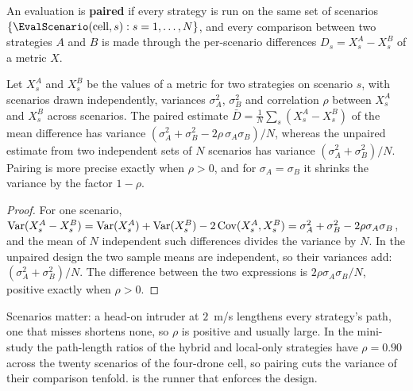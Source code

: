 \begin{definition}
\label{def:ch25-paired}
An evaluation is \textbf{paired} if every strategy is
run on the same set of scenarios $\set{\EvalScenario(\text{cell}, s) :
s = 1, \dots, N}$, and every comparison between two strategies $A$ and $B$
is made through the per-scenario differences $D_s = X^A_s - X^B_s$ of a
metric $X$.
\end{definition}

\begin{proposition}
\label{thm:ch25-pairing}
Let $X^A_s$ and $X^B_s$ be the values of a metric for two strategies on
scenario $s$, with scenarios drawn independently, variances $\sigma_A^2$,
$\sigma_B^2$ and correlation $\rho$ between $X^A_s$ and $X^B_s$ across
scenarios. The paired estimate $\bar D = \frac1N \sum_s (X^A_s - X^B_s)$ of
the mean difference has variance
$(\sigma_A^2 + \sigma_B^2 - 2\rho\,\sigma_A\sigma_B)/N$, whereas the
unpaired estimate from two independent sets of $N$ scenarios has variance
$(\sigma_A^2 + \sigma_B^2)/N$. Pairing is more precise exactly when
$\rho > 0$, and for $\sigma_A = \sigma_B$ it shrinks the variance by the
factor $1 - \rho$.
\end{proposition}
\begin{proof}
For one scenario, $\operatorname{Var}(X^A_s - X^B_s) = \operatorname{Var}(X^A_s) + \operatorname{Var}(X^B_s) -
2\operatorname{Cov}(X^A_s, X^B_s) = \sigma_A^2 + \sigma_B^2 - 2\rho\sigma_A\sigma_B$, and
the mean of $N$ independent such differences divides the variance by $N$.
In the unpaired design the two sample means are independent, so their
variances add: $(\sigma_A^2 + \sigma_B^2)/N$. The difference between the two
expressions is $2\rho\sigma_A\sigma_B/N$, positive exactly when
$\rho > 0$.
\end{proof}

Scenarios matter: a head-on intruder at $2$~m/s lengthens every strategy's
path, one that misses shortens none, so $\rho$ is positive and usually large.
In the mini-study the path-length ratios of the hybrid and local-only
strategies have $\rho = 0.90$ across the twenty scenarios of the four-drone
cell, so pairing cuts the variance of their comparison tenfold.
 is the runner that enforces the design.

